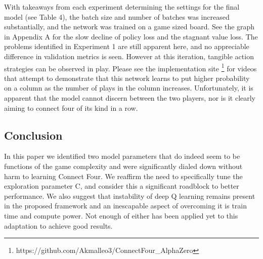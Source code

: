\documentclass[twoside,11pt]{article}
\begin{document}
With takeaways from each experiment determining the settings for the final model
 (see Table 4), the batch size and number of batches was increased substantially, and the network
was trained on a game sized board. See the graph in Appendix A for the slow 
decline of policy loss and the stagnant value loss. The problems identified in Experiment 1
are still apparent here, and no appreciable difference in validation metrics is seen. However
at this iteration, tangible action strategies can be observed in play. Please see the implementation site
\footnote{https://github.com/Akmalleo3/ConnectFour\_AlphaZero} for videos that attempt to demonstrate 
that this network learns to put higher probability on a column as the number of plays in the column increases.
Unfortunately, it is apparent that the model cannot discern between the two players, nor is 
it clearly aiming to connect four of its kind in a row.





\subsection{Conclusion}
In this paper we identified two model parameters that 
do indeed seem to be functions of the game complexity and 
were significantly dialed down without harm to learning Connect Four.
We reaffirm the need to specifically tune the exploration parameter C, and 
consider this a significant roadblock to better performance. We also 
suggest that instability of deep Q learning remains present in the proposed framework
and an inescapable aspect of overcoming it is train time and compute power.
Not enough of either has been applied yet to this adaptation to achieve good results.








\end{document}
